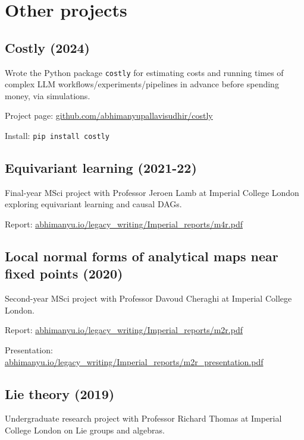 \documentclass{article}
\begin{document}
\section*{Other projects}

\subsection*{Costly (2024)}

Wrote the Python package \texttt{costly} for estimating costs and running times of complex LLM workflows/experiments/pipelines in advance before spending money, via simulations.

Project page: \href{https://github.com/abhimanyupallavisudhir/costly}{github.com/abhimanyupallavisudhir/costly}

Install: \texttt{pip install costly}

\subsection*{Equivariant learning (2021-22)}

Final-year MSci project with Professor Jeroen Lamb at Imperial College London exploring equivariant learning and causal DAGs.

Report: \href{https://abhimanyu.io/legacy_writing/Imperial_reports/m4r.pdf}{abhimanyu.io/legacy\_writing/Imperial\_reports/m4r.pdf}

\subsection*{Local normal forms of analytical maps near fixed points (2020)}

Second-year MSci project with Professor Davoud Cheraghi at Imperial College London.

Report: \href{https://abhimanyu.io/legacy_writing/Imperial_reports/m2r.pdf}{abhimanyu.io/legacy\_writing/Imperial\_reports/m2r.pdf}

Presentation: \href{https://abhimanyu.io/legacy_writing/Imperial_reports/m2r_presentation.pdf}{abhimanyu.io/legacy\_writing/Imperial\_reports/m2r\_presentation.pdf}

\subsection*{Lie theory (2019)}

Undergraduate research project with Professor Richard Thomas at Imperial College London on Lie groups and algebras.
\end{document}
